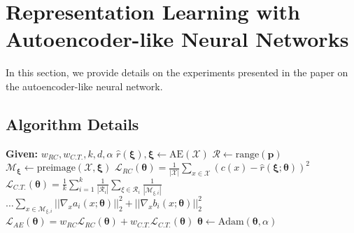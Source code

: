 \documentclass[letterpaper]{article} %
\begin{document}
\section{Representation Learning with Autoencoder-like Neural Networks}

In this section, we provide details on the experiments presented in the paper on the autoencoder-like neural network.

\subsection{Algorithm Details}

\begin{algorithm*}[t]
\caption{Autoencoder-like Neural Network Training}\label{alg:auto-encoder_training}
\begin{algorithmic}[1]
\State \textbf{Given:} $w_{RC}, w_{C.T.}, k, d, \alpha$ 
        \State $\hat{r}(\boldsymbol\xi), \boldsymbol\xi \gets \textrm{AE}(\mathcal{X})$  \label{line: AE pass}
         \label{line:every_d_iter}
            \State $\mathcal{R}\gets\textrm{range}(\boldsymbol p)$ 
            \State 
            $\mathcal{M}_{\boldsymbol\xi} \gets \textrm{preimage}(\mathcal{X}, \boldsymbol\xi)$  \label{line: preimage}
        \EndIf
        \State $\mathcal{L}_{RC}(\boldsymbol\theta) = \frac{1}{|\mathcal{X}|}\sum_{x\in\mathcal{X}}\left(c(x)-\hat{r}(\boldsymbol\xi; \boldsymbol\theta)\right)^2$  \label{line: RC loss}
        \State $ \mathcal{L}_{C.T.}(\boldsymbol\theta) = \frac{1}{k}\sum_{i=1}^k\frac{1}{|\mathcal{R}_i|}\sum_{\xi\in\mathcal{R}_i}\frac{1}{|\mathcal{M}_{\xi, i}|}$  \label{line: CT loss}
        \State \qquad\qquad\qquad\qquad
        $\ldots \sum_{x\in\mathcal{M}_{\xi, i}}
          ||\nabla_x a_i(x; \boldsymbol\theta) ||_2^2 + || \nabla_x b_i(x; \boldsymbol\theta)||_2^2$
        \State $\mathcal{L}_{AE}(\boldsymbol\theta)=w_{RC}\mathcal{L}_{RC}(\boldsymbol\theta)+w_{C.T.}\mathcal{L}_{C.T.}(\boldsymbol\theta)$  \label{line: total loss}
        \State $\boldsymbol\theta\gets\textrm{Adam}(\boldsymbol\theta, \alpha)$ 
    \EndFor
\EndFor
    
\end{algorithmic}
\end{algorithm*}
\end{document}
